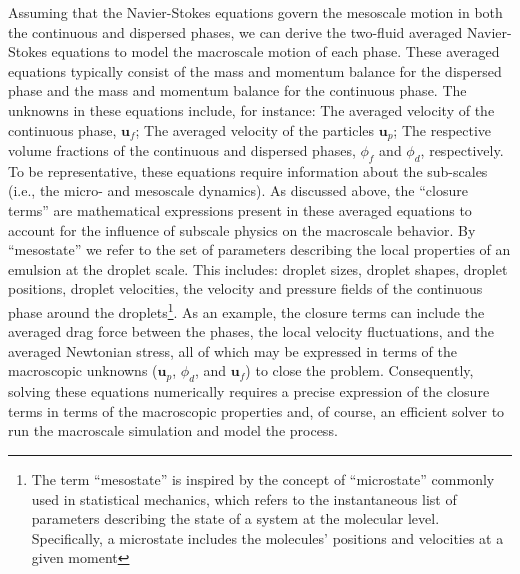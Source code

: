 Assuming that the Navier-Stokes equations govern the mesoscale motion in both the continuous and dispersed phases, we can derive the two-fluid averaged Navier-Stokes equations to model the macroscale motion of each phase. 
These averaged equations typically consist of the mass and momentum balance for the dispersed phase and the mass and momentum balance for the continuous phase. 
The unknowns in these equations include, for instance: The averaged velocity of the continuous phase, $\textbf{u}_f$; The averaged velocity of the particles $\textbf{u}_p$; The respective volume fractions of the continuous and dispersed phases, $\phi_f$ and $\phi_d$, respectively. 
To be representative, these equations require information about the sub-scales (i.e., the micro- and mesoscale dynamics).
As discussed above, the ``closure terms'' are mathematical expressions present in these averaged equations to account for the influence of subscale physics on the macroscale behavior. 
By ``mesostate'' we refer to the set of parameters describing the local properties of an emulsion at the droplet scale.
This includes:  droplet sizes, droplet shapes, droplet positions, droplet velocities, the velocity and pressure fields of the continuous phase around the droplets\footnote{
    The term ``mesostate'' is inspired by the concept of ``microstate'' commonly used in statistical mechanics, which refers to the instantaneous list of parameters describing the state of a system at the molecular level. Specifically, a microstate includes the molecules' positions and velocities at a given moment
    }. 
As an example, the closure terms can include the averaged drag force between the phases, the local velocity fluctuations, and the averaged Newtonian stress, all of which may be expressed in terms of the macroscopic unknowns ($\textbf{u}_p$, $\phi_d$, and $\textbf{u}_f$) to close the problem.
Consequently, solving these equations numerically requires a precise expression of the closure terms in terms of the macroscopic properties and, of course, an efficient solver to run the macroscale simulation and model the process.

